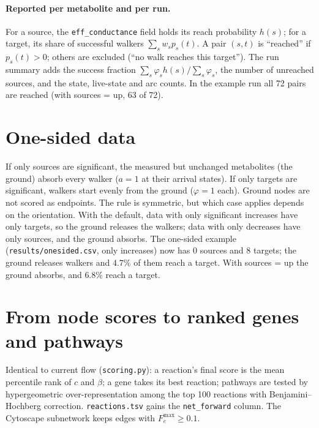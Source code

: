 \documentclass[11pt]{article}
\newcommand{\code}[1]{\texttt{#1}}
\begin{document}
\paragraph{Reported per metabolite and per run.} For a source, the
\code{eff\_conductance} field holds its reach probability $h(s)$; for a target, its
share of successful walkers $\sum_s w_s p_s(t)$. A pair $(s,t)$ is ``reached'' if
$p_s(t)>0$; others are excluded (``no walk reaches this target''). The run summary
adds the success fraction $\sum_s\varphi_s h(s)/\sum_s\varphi_s$, the number of
unreached sources, and the state, live-state and arc counts. In the example run all
72 pairs are reached (with sources = up, 63 of 72).

\section{One-sided data}
If only sources are significant, the measured but unchanged metabolites (the ground)
absorb every walker ($a=1$ at their arrival states). If only targets are significant,
walkers start evenly from the ground ($\varphi=1$ each). Ground nodes are not scored as
endpoints. The rule is symmetric, but which case applies depends on the orientation.
With the default, data with only significant increases have only targets, so the
ground releases the walkers; data with only decreases have only sources, and the
ground absorbs. The one-sided example (\code{results/onesided.csv}, only increases)
now has 0 sources and 8 targets; the ground releases walkers and $4.7\%$ of them reach
a target. With sources = up the ground absorbs, and $6.8\%$ reach a target.

\section{From node scores to ranked genes and pathways}
Identical to current flow (\code{scoring.py}): a reaction's final score is the mean
percentile rank of $c$ and $\beta$; a gene takes its best reaction; pathways are tested
by hypergeometric over-representation among the top 100 reactions with
Benjamini--Hochberg correction. \code{reactions.tsv} gains the \code{net\_forward}
column. The Cytoscape subnetwork keeps edges with $F^{\max}_e\ge0.1$.
\end{document}
